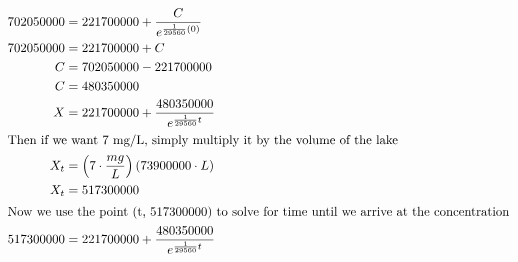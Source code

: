 \documentclass[12pt]{article}
\begin{document}
\begin{align}
  702050000                                                                                & =221700000+\frac{C}{e^{\frac{1}{29560}\left(0\right)}}                                                                                                                    \\
  702050000                                                                                & =221700000+C                                                                                                                                                              \\
  C                                                                                        & =702050000-221700000                                                                                                                                                      \\
  C                                                                                        & =480350000                                                                                                                                                                \\
  X                                                                                        & =221700000+\frac{480350000}{e^{\frac{1}{29560}t}}                                                                                                                         \\
  \intertext{Then if we want 7 mg/L, simply multiply it by the volume of the lake}
  X_{t}                                                                                    & =\left(7\cdot\frac{mg}{L}\right)\left(73900000\cdot L\right)                                                                                                              \\
  X_{t}                                                                                    & =517300000                                                                                                                                                                \\
  \intertext{Now we use the point (t, 517300000) to solve for time until we arrive at the concentration}
  517300000                                                                                & =221700000+\frac{480350000}{e^{\frac{1}{29560}t}}                                                                                                                         \\

\end{align}
\end{document}
